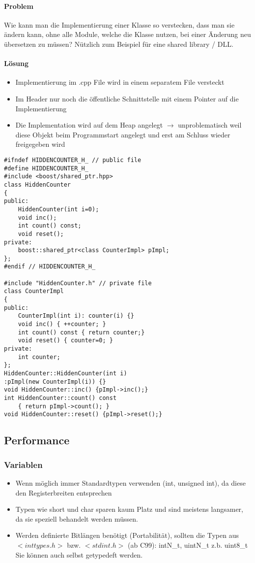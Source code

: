 \paragraph{Problem} Wie kann man die Implementierung einer Klasse so verstecken, dass man sie
ändern kann, ohne alle Module, welche die Klasse nutzen, bei einer Änderung
neu übersetzen zu müssen?
Nützlich zum Beispiel für eine shared library / DLL.

\paragraph{Lösung}
\begin{itemize}
\item Implementierung im .cpp File wird in einem separatem File versteckt
\item Im Header nur noch die öffentliche Schnittstelle mit einem Pointer auf die Implementierung
\item Die Implementation wird auf dem Heap angelegt $\rightarrow$ unproblematisch weil diese Objekt beim Programmstart angelegt und erst am Schluss wieder freigegeben wird
\end{itemize}

\begin{lstlisting}
#ifndef HIDDENCOUNTER_H_ // public file
#define HIDDENCOUNTER_H_
#include <boost/shared_ptr.hpp>
class HiddenCounter
{
public:
	HiddenCounter(int i=0);
	void inc();
	int count() const;
	void reset();
private:
	boost::shared_ptr<class CounterImpl> pImpl;
};
#endif // HIDDENCOUNTER_H_

#include "HiddenCounter.h" // private file
class CounterImpl
{
public:
	CounterImpl(int i): counter(i) {}
	void inc() { ++counter; }
	int count() const { return counter;}
	void reset() { counter=0; }
private:
	int counter;
};
HiddenCounter::HiddenCounter(int i)
:pImpl(new CounterImpl(i)) {}
void HiddenCounter::inc() {pImpl->inc();}
int HiddenCounter::count() const
	{ return pImpl->count(); }
void HiddenCounter::reset() {pImpl->reset();}
\end{lstlisting}


\subsection{Performance}

\subsubsection{Variablen}
\begin{itemize}
	\item Wenn möglich immer Standardtypen verwenden (int, unsigned int), da
		diese den Registerbreiten entsprechen
	\item Typen wie short und char sparen kaum Platz und sind meistens
		langsamer, da sie speziell behandelt werden müssen.
	\item Werden definierte Bitlängen benötigt (Portabilität), sollten die Typen aus
		$<inttypes.h>$ bzw. $<stdint.h>$ (ab C99): 
		intN\_t,  uintN\_t z.b. uint8\_t \\
		Sie können auch selbst getypedeft werden.
\end{itemize}

